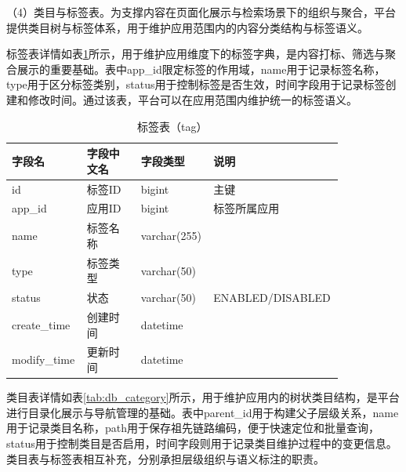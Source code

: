 \FloatBarrier

（4）类目与标签表。为支撑内容在页面化展示与检索场景下的组织与聚合，平台提供类目树与标签体系，用于维护应用范围内的内容分类结构与标签语义。

标签表详情如表\ref{tab:db_tag}所示，用于维护应用维度下的标签字典，是内容打标、筛选与聚合展示的重要基础。表中app\_\allowbreak id限定标签的作用域，name用于记录标签名称，type用于区分标签类别，status用于控制标签是否生效，时间字段用于记录标签创建和修改时间。通过该表，平台可以在应用范围内维护统一的标签语义。

\begin{table}[!htbp]
  \centering
  \caption{标签表（tag）}
  \label{tab:db_tag}
  \small
  \begin{tabular}{>{\raggedright\arraybackslash}p{0.20\linewidth}|>{\raggedright\arraybackslash}p{0.16\linewidth}|>{\raggedright\arraybackslash}p{0.16\linewidth}|>{\raggedright\arraybackslash}p{0.32\linewidth}}
    \hline
    字段名 & 字段中文名 & 字段类型 & 说明 \\ \hline
    id & 标签ID & bigint & 主键 \\ \hline
    app\_id & 应用ID & bigint & 标签所属应用 \\ \hline
    name & 标签名称 & varchar(255) & \\ \hline
    type & 标签类型 & varchar(50) &  \\ \hline
    status & 状态 & varchar(50) & ENABLED/DISABLED \\ \hline
    create\_time & 创建时间 & datetime & \\ \hline
    modify\_time & 更新时间 & datetime & \\ \hline
  \end{tabular}
\end{table}

类目表详情如表\ref{tab:db_category}所示，用于维护应用内的树状类目结构，是平台进行目录化展示与导航管理的基础。表中parent\_\allowbreak id用于构建父子层级关系，name用于记录类目名称，path用于保存祖先链路编码，便于快速定位和批量查询，status用于控制类目是否启用，时间字段则用于记录类目维护过程中的变更信息。类目表与标签表相互补充，分别承担层级组织与语义标注的职责。

